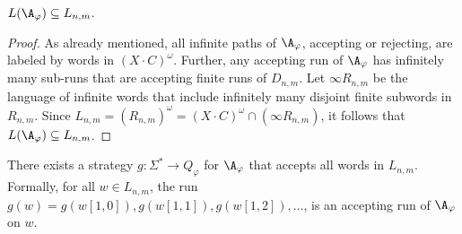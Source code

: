 \documentclass{lmcs}
\begin{document}
\begin{prop}
	$L(\A_\varphi)\subseteq L_{n,m}$.
\end{prop}
\begin{proof}
	As already mentioned, all infinite paths of $\A_\varphi$, accepting or rejecting, are labeled by words in $(X\cdot C)^\omega$. 
	Further, any accepting run of $\A_\varphi$ has infinitely many sub-runs that are accepting finite runs of $D_{n,m}$. 
		Let $\infty R_{n,m}$ be the language of infinite words that include infinitely many disjoint finite subwords in $R_{n,m}$. 
	Since $L_{n,m}=(R_{n,m})^\omega = (X\cdot C)^\omega\cap (\infty R_{n,m})$, it follows that $L(\A_\varphi)\subseteq L_{n,m}$. 
\end{proof}

\begin{prop}

\label{A phi HD}
	There exists a strategy $g:\Sigma^*\rightarrow Q_{\varphi}$ for $\A_\varphi$ that accepts all words in $L_{n,m}$. Formally, for all $w\in L_{n,m}$, the run $g(w)=g(w[1,0]),g(w[1,1]),g(w[1,2]),\ldots$, is an accepting run of $\A_\varphi$ on $w$.
\end{prop}
\end{document}
